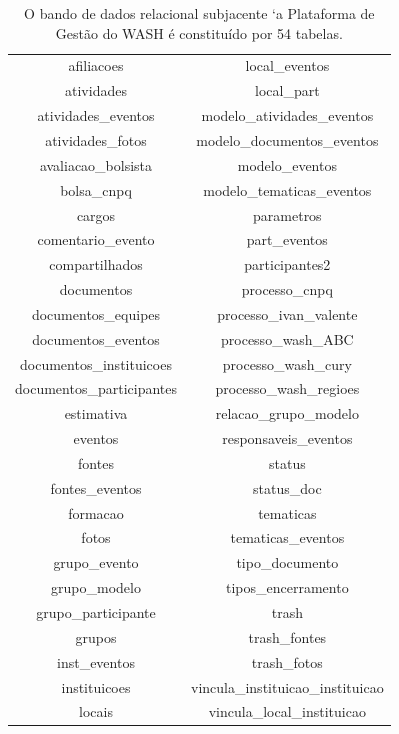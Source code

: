 \documentclass[
12pt,		%
openright,	%
twoside,  %
a4paper,			%
chapter=TITLE,		%
english,			%
french,				%
spanish,			%
brazil				%
]{USPSC-classe/USPSC_RedarTex}
\begin{document}
\begin{table}[Htb]
\tiny
\caption{\label{ae9b2d69e43e45d93e0f8dd3f22a4ccbf44c76f0}O bando de dados relacional subjacente `a Plataforma de Gest\~ao do WASH \'e constitu\'{i}do por 54 tabelas.}

\centering
\begin{tabular}{|c|c|}
\hline
afiliacoes                     &   local\_eventos \\
 atividades                     &   local\_part \\
 atividades\_eventos             &   modelo\_atividades\_eventos \\
 atividades\_fotos               &   modelo\_documentos\_eventos \\
 avaliacao\_bolsista             &   modelo\_eventos \\
 bolsa\_cnpq                     &   modelo\_tematicas\_eventos \\
 cargos                         &   parametros \\
 comentario\_evento              &   part\_eventos \\
 compartilhados                 &   participantes2 \\
 documentos                     &   processo\_cnpq \\
 documentos\_equipes             &   processo\_ivan\_valente \\
 documentos\_eventos             &   processo\_wash\_ABC \\
 documentos\_instituicoes        &   processo\_wash\_cury \\
 documentos\_participantes       &   processo\_wash\_regioes \\
 estimativa                     &   relacao\_grupo\_modelo \\
 eventos                        &   responsaveis\_eventos \\
 fontes                         &   status \\
 fontes\_eventos                 &   status\_doc \\
 formacao                       &   tematicas \\
 fotos                          &   tematicas\_eventos \\
 grupo\_evento                   &   tipo\_documento \\
 grupo\_modelo                   &   tipos\_encerramento \\
 grupo\_participante             &   trash \\
 grupos                         &   trash\_fontes \\
 inst\_eventos                   &   trash\_fotos \\
 instituicoes                   &   vincula\_instituicao\_instituicao \\
 locais                         &   vincula\_local\_instituicao \\
\hline
\end{tabular}
\end{table}
\end{document}
